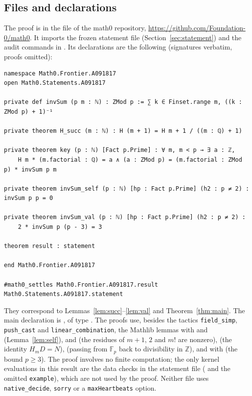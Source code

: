 \documentclass[11pt]{amsart}
\theoremstyle{plain}
\theoremstyle{definition}
\newcommand{\Z}{\mathbb{Z}}
\newcommand{\F}{\mathbb{F}_p}
\begin{document}
\subsection*{Files and declarations}
The proof is in the file  of the math0 repository, \url{https://github.com/Foundation-0/math0}. It imports the frozen statement file  (Section~\ref{sec:statement}) and the audit commands in . Its declarations are the following (signatures verbatim, proofs omitted):
\begin{lstlisting}
namespace Math0.Frontier.A091817
open Math0.Statements.A091817

private def invSum (p m : ℕ) : ZMod p := ∑ k ∈ Finset.range m, ((k : ZMod p) + 1)⁻¹

private theorem H_succ (m : ℕ) : H (m + 1) = H m + 1 / ((m : ℚ) + 1)

private theorem key (p : ℕ) [Fact p.Prime] : ∀ m, m < p → ∃ a : ℤ,
    H m * (m.factorial : ℚ) = a ∧ (a : ZMod p) = (m.factorial : ZMod p) * invSum p m

private theorem invSum_self (p : ℕ) [hp : Fact p.Prime] (h2 : p ≠ 2) : invSum p p = 0

private theorem invSum_val (p : ℕ) [hp : Fact p.Prime] (h2 : p ≠ 2) :
    2 * invSum p (p - 3) = 3

theorem result : statement

end Math0.Frontier.A091817

#math0_settles Math0.Frontier.A091817.result Math0.Statements.A091817.statement
\end{lstlisting}
They correspond to Lemmas~\ref{lem:succ}--\ref{lem:val} and Theorem~\ref{thm:main}. The main declaration is , of type . The proofs use, besides the tactics \texttt{field\_simp}, \texttt{push\_cast} and \texttt{linear\_combination}, the Mathlib lemmas  with  and  (Lemma~\ref{lem:self}),  and  (the residues of $m+1$, $2$ and $m!$ are nonzero),  (the identity $H_mD=N$),  (passing from $\F$ back to divisibility in $\Z$), and  with  (the bound $p\ge3$). The proof involves no finite computation; the only kernel evaluations in this result are the data checks in the statement file ( and the omitted \texttt{example}), which are not used by the proof. Neither file uses \texttt{native\_decide}, \texttt{sorry} or a \texttt{maxHeartbeats} option.
\end{document}
